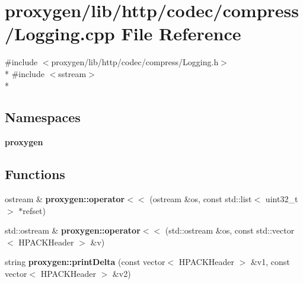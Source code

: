 \section{proxygen/lib/http/codec/compress/\+Logging.cpp File Reference}
\label{http_2codec_2compress_2Logging_8cpp}
{\ttfamily \#include $<$proxygen/lib/http/codec/compress/\+Logging.\+h$>$}\\*
{\ttfamily \#include $<$sstream$>$}\\*
\subsection*{Namespaces}
\begin{DoxyCompactItemize}
\item 
 {\bf proxygen}
\end{DoxyCompactItemize}
\subsection*{Functions}
\begin{DoxyCompactItemize}
\item 
ostream \& {\bf proxygen\+::operator$<$$<$} (ostream \&os, const std\+::list$<$ uint32\+\_\+t $>$ $\ast$refset)
\item 
std\+::ostream \& {\bf proxygen\+::operator$<$$<$} (std\+::ostream \&os, const std\+::vector$<$ H\+P\+A\+C\+K\+Header $>$ \&v)
\item 
string {\bf proxygen\+::print\+Delta} (const vector$<$ H\+P\+A\+C\+K\+Header $>$ \&v1, const vector$<$ H\+P\+A\+C\+K\+Header $>$ \&v2)
\end{DoxyCompactItemize}
